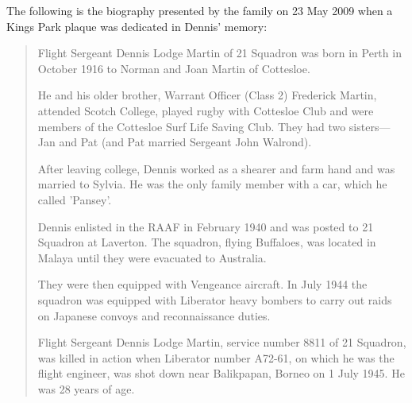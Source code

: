 
The following is the biography presented by the family on 23 May 2009 when a Kings Park plaque was dedicated in Dennis' memory:\cite{KingsParkDennisMartin}

\begin{quotation}
Flight Sergeant Dennis Lodge Martin of 21 Squadron was born in Perth in October 1916 to Norman and Joan Martin of Cottesloe.

He and his older brother, Warrant Officer (Class 2) Frederick Martin, attended Scotch College,
played rugby with Cottesloe Club and were members of the Cottesloe Surf Life Saving Club.
They had two sisters---Jan and Pat (and Pat married Sergeant John Walrond).

After leaving college, Dennis worked as a shearer and farm hand and was married to Sylvia.
He was the only family member with a car, which he called 'Pansey'.

Dennis enlisted in the RAAF in February 1940 and was posted to 21 Squadron at Laverton.
The squadron, flying Buffaloes, was located in Malaya until they were evacuated to Australia.

They were then equipped with Vengeance aircraft. In July 1944 the squadron was equipped with Liberator heavy bombers
to carry out raids on Japanese convoys and reconnaissance duties.

Flight Sergeant Dennis Lodge Martin, service number 8811 of 21 Squadron, was killed in action when Liberator number A72-61,
on which he was the flight engineer, was shot down near Balikpapan, Borneo on 1 July 1945. He was 28 years of age.
\end{quotation}
